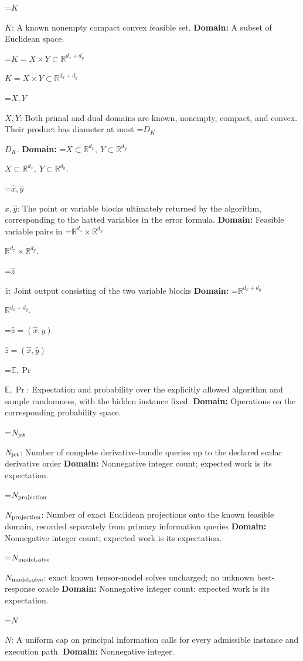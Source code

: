 \documentclass[10pt,a4paper]{article}
\newcommand{\AtlasMath}[1]{\par\begingroup\centering\setbox0=\hbox{$\displaystyle #1$}\ifdim\wd0>1.4\linewidth\typeout{ATLAS WIDE FORMULA: \the\wd0}\fi\ifdim\wd0>\linewidth\resizebox{\linewidth}{!}{\box0}\else\box0\fi\par\endgroup}
\newcommand{\AtlasInlineMath}[1]{\begingroup\setbox0=\hbox{$#1$}\ifdim\wd0>.4\linewidth\endgroup\AtlasMath{#1}\else\endgroup$#1$\fi}
\begin{document}
\AtlasInlineMath{K}: A known nonempty compact convex feasible set. \textbf{Domain:} A subset of Euclidean space.



\AtlasInlineMath{K=X\times Y\subset\mathbb R^{d_x+d_y}}



\AtlasInlineMath{X,Y}: Both primal and dual domains are known, nonempty, compact, and convex. Their product has diameter at most \AtlasInlineMath{D_K}. \textbf{Domain:} \AtlasInlineMath{X\subset\mathbb R^{d_x},\ Y\subset\mathbb R^{d_y}}.



\AtlasInlineMath{\widehat x,\widehat y}: The point or variable blocks ultimately returned by the algorithm, corresponding to the hatted variables in the error formula. \textbf{Domain:} Feasible variable pairs in \AtlasInlineMath{\mathbb R^{d_x}\times\mathbb R^{d_y}}.



\AtlasInlineMath{\widehat z}: Joint output consisting of the two variable blocks \textbf{Domain:} \AtlasInlineMath{\mathbb R^{d_x+d_y}}.



\AtlasInlineMath{\widehat z=(\widehat x,\widehat y)}



\AtlasInlineMath{\mathbb E,\Pr}: Expectation and probability over the explicitly allowed algorithm and sample randomness, with the hidden instance fixed. \textbf{Domain:} Operations on the corresponding probability space.



\AtlasInlineMath{N_{\rm jet}}: Number of complete derivative-bundle queries up to the declared scalar derivative order \textbf{Domain:} Nonnegative integer count; expected work is its expectation.



\AtlasInlineMath{N_{\rm projection}}: Number of exact Euclidean projections onto the known feasible domain, recorded separately from primary information queries \textbf{Domain:} Nonnegative integer count; expected work is its expectation.



\AtlasInlineMath{N_{\rm model_solve}}: exact known tensor-model solves uncharged; no unknown best-response oracle \textbf{Domain:} Nonnegative integer count; expected work is its expectation.



\AtlasInlineMath{N}: A uniform cap on principal information calls for every admissible instance and execution path. \textbf{Domain:} Nonnegative integer.
\end{document}
